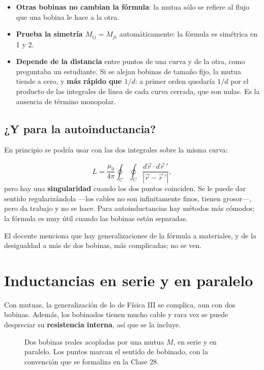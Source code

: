 \documentclass[12pt,a4paper]{article}
\begin{document}
\begin{itemize}
  \item \textbf{Otras bobinas no cambian la fórmula}: la mutua sólo se refiere al flujo
  que una bobina le hace a la otra.
  \item \textbf{Prueba la simetría $M_{ij} = M_{ji}$} automáticamente: la fórmula es
  simétrica en 1 y 2.
  \item \textbf{Depende de la distancia} entre puntos de una curva y de la otra, como
  preguntaba un estudiante. Si se alejan bobinas de tamaño fijo, la mutua
  tiende a cero, y \textbf{más rápido que $1/d$}: a primer orden quedaría $1/d$ por
  el producto de las integrales de línea de cada curva cerrada, que son nulas.
  Es la ausencia de término monopolar.
\end{itemize}

\subsection{¿Y para la autoinductancia?}

En principio se podría usar con las dos integrales sobre la misma curva:

\[
L = \frac{\mu_0}{4\pi}\oint_{C}\oint_{C}\frac{d\vec r\cdot d\vec r\,'}{|\vec r-\vec r\,'|},
\]
pero hay una \textbf{singularidad} cuando los dos puntos coinciden. Se le puede dar
sentido regularizándola ---los cables no son infinitamente finos, tienen
grosor---, pero da trabajo y no se hace. Para autoinductancias hay métodos más
cómodos; la fórmula es muy útil cuando las bobinas están separadas.

\begin{notebox}
El docente menciona que hay generalizaciones de la fórmula a materiales, y de
la desigualdad a más de dos bobinas, más complicadas; no se ven.
\end{notebox}

\section{Inductancias en serie y en paralelo}

Con mutuas, la generalización de lo de Física III se complica, aun con dos
bobinas. Además, los bobinados tienen mucho cable y rara vez se puede despreciar
su \textbf{resistencia interna}, así que se la incluye.

\begin{figure}[H]
  \centering
  
  \caption{Dos bobinas reales acopladas por una mutua $M$, en serie y en paralelo. Los puntos marcan el sentido de bobinado, con la convención que se formaliza en la Clase 28.}
\end{figure}
\end{document}
